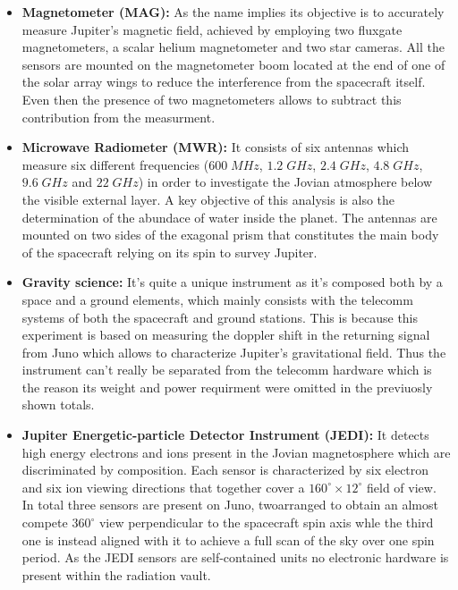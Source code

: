 \begin{itemize}
    \item \textbf{Magnetometer (MAG):} As the name implies its objective is to accurately measure Jupiter's magnetic field, achieved by employing two fluxgate magnetometers, a scalar helium magnetometer and two star cameras. All the sensors are mounted on the magnetometer boom located at the end of one of the solar array wings to reduce the interference from the spacecraft itself. Even then the presence of two magnetometers allows to subtract this contribution from the measurment.
    
    \item \textbf{Microwave Radiometer (MWR):} It consists of six antennas which measure six different frequencies ($600 \;MHz$, $1.2 \;GHz$, $2.4 \;GHz$, $4.8 \;GHz$, $9.6 \;GHz$ and $22 \;GHz$) in order to investigate the Jovian atmosphere below the visible external layer. A key objective of this analysis is also the determination of the abundace of water inside the planet. The antennas are mounted on two sides of the exagonal prism that constitutes the main body of the spacecraft relying on its spin to survey Jupiter.
    
    \item \textbf{Gravity science:} It's quite a unique instrument as it's composed both by a space and a ground elements, which mainly consists with the telecomm systems of both the spacecraft and ground stations. This is because this experiment is based on measuring the doppler shift in the returning signal from Juno which allows to characterize Jupiter's gravitational field. Thus the instrument can't really be separated from the telecomm hardware which is the reason its weight and power requirment were omitted in the previuosly shown totals.
    
    \item \textbf{Jupiter Energetic-particle Detector Instrument (JEDI):} It detects high energy electrons and ions present in the Jovian magnetosphere which are discriminated by composition. Each sensor is characterized by six electron and six ion viewing directions that together cover a $160^{\circ} \times 12^{\circ}$ field of view. In total three sensors are present on Juno, twoarranged to obtain an almost compete $360^{\circ}$ view perpendicular to the spacecraft spin axis whle the third one is instead aligned with it to achieve a full scan of the sky over one spin period. As the JEDI sensors are self-contained units no electronic hardware is present within the radiation vault.


\end{itemize}
